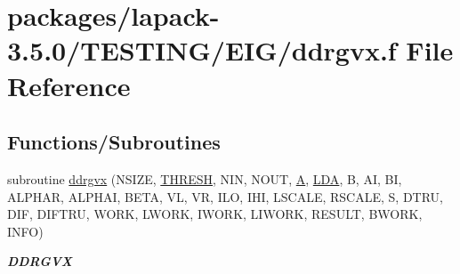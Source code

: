 \hypertarget{ddrgvx_8f}{}\section{packages/lapack-\/3.5.0/\+T\+E\+S\+T\+I\+N\+G/\+E\+I\+G/ddrgvx.f File Reference}
\label{ddrgvx_8f}
\subsection*{Functions/\+Subroutines}
\begin{DoxyCompactItemize}
\item 
subroutine \hyperlink{group__double__eig_ga12fe443f6eebc293d99eae77fa84d9c5}{ddrgvx} (N\+S\+I\+Z\+E, \hyperlink{zlaqgs_8c_a0656018abfc9fa2821827415f5d5ea57}{T\+H\+R\+E\+S\+H}, N\+I\+N, N\+O\+U\+T, \hyperlink{classA}{A}, \hyperlink{example__user_8c_ae946da542ce0db94dced19b2ecefd1aa}{L\+D\+A}, B, A\+I, B\+I, A\+L\+P\+H\+A\+R, A\+L\+P\+H\+A\+I, B\+E\+T\+A, V\+L, V\+R, I\+L\+O, I\+H\+I, L\+S\+C\+A\+L\+E, R\+S\+C\+A\+L\+E, S, D\+T\+R\+U, D\+I\+F, D\+I\+F\+T\+R\+U, W\+O\+R\+K, L\+W\+O\+R\+K, I\+W\+O\+R\+K, L\+I\+W\+O\+R\+K, R\+E\+S\+U\+L\+T, B\+W\+O\+R\+K, I\+N\+F\+O)
\begin{DoxyCompactList}\small\item\em {\bfseries D\+D\+R\+G\+V\+X} \end{DoxyCompactList}\end{DoxyCompactItemize}

